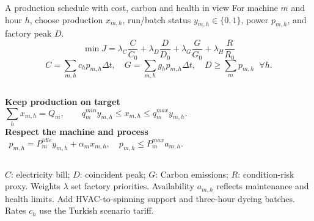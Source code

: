 \documentclass[aspectratio=169,10pt]{beamer}
\begin{document}
\begin{frame}{A production schedule with cost, carbon and health in view}
\small
For machine $m$ and hour $h$, choose production $x_{m,h}$, run/batch status $y_{m,h}\in\{0,1\}$, power $p_{m,h}$, and factory peak $D$.
\[
\min J=\lambda_C\frac{C}{C_0}+\lambda_D\frac{D}{D_0}
       +\lambda_G\frac{G}{G_0}+\lambda_H\frac{R}{R_0}
\]
\vspace{-2mm}
\[
C=\sum_{m,h}c_h p_{m,h}\Delta t,\quad
G=\sum_{m,h}g_h p_{m,h}\Delta t,\quad
D\geq\sum_m p_{m,h}\;\;\forall h.
\]
\vspace{-2mm}
\begin{columns}[T,onlytextwidth]
\textbf{Keep production on target}
\[
\sum_h x_{m,h}=Q_m,\qquad
q_m^{min}y_{m,h}\leq x_{m,h}\leq q_m^{max}y_{m,h}.
\]
\textbf{Respect the machine and process}
\[
p_{m,h}=P_m^{idle}y_{m,h}+\alpha_m x_{m,h},\quad
p_{m,h}\leq P_m^{max}a_{m,h}.
\]
\end{columns}
\vspace{-2mm}
\footnotesize
$C$: electricity bill; $D$: coincident peak; $G$: Carbon emissions; $R$: condition-risk proxy. Weights $\lambda$ set factory priorities. Availability $a_{m,h}$ reflects maintenance and health limits. Add HVAC-to-spinning support and three-hour dyeing batches. Rates $c_h$ use the Turkish scenario tariff.
\end{frame}
\end{document}
